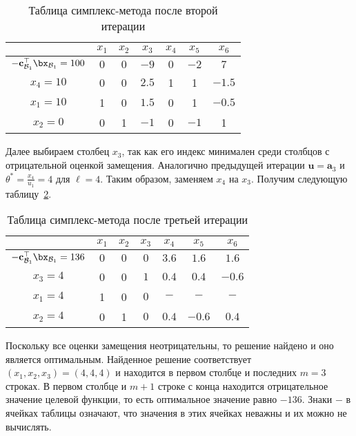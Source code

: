 \documentclass[12pt]{article}
\begin{document}
\begin{table}[!ht]
\centering
\caption{Таблица симплекс-метода после второй итерации}
\begin{tabular}{|c|cccccc|}
\hline
& $x_1$ & $x_2$ & $x_3$ & $x_4$ & $x_5$ & $x_6$\\
\hline
$-\mathbf{c}_{\mathcal{B}_1}^{\top}\bx_{\mathcal{B}_1} = 100$ & $0$ & $0$ & $-9$ & $0$ & $-2$ & $7$ \\
\hline
$x_4 = 10$ & 0 & 0 & $\mathbf{2.5}$ & 1 & 1 & $-1.5$ \\
$x_1 = 10$ & 1 & 0 & $1.5$ & 0 & 1 & $-0.5$ \\
$x_2 = 0$ & 0 & 1 & $-1$ & 0 & $-1$ & 1 \\
\hline
\end{tabular}
\label{tab::simplex2}
\end{table}

Далее выбираем столбец $x_3$, так как его индекс минимален среди столбцов с отрицательной оценкой замещения.
Аналогично предыдущей итерации $\mathbf{u} = \mathbf{a}_3$ и $\theta^* = \frac{x_4}{u_1} = 4$ для $\ell = 4$.
Таким образом, заменяем $x_4$ на $x_3$.
Получим следующую таблицу~\ref{tab::simplex3}.

\begin{table}[!ht]
\centering
\caption{Таблица симплекс-метода после третьей итерации}
\begin{tabular}{|c|cccccc|}
\hline
& $x_1$ & $x_2$ & $x_3$ & $x_4$ & $x_5$ & $x_6$\\
\hline
$-\mathbf{c}_{\mathcal{B}_1}^{\top}\bx_{\mathcal{B}_1} = 136$ & $0$ & $0$ & $0$ & $3.6$ & $1.6$ & $1.6$ \\
\hline
$x_3 = 4$ & 0 & 0 & $1$ & $0.4$ & $0.4$ & $-0.6$ \\
$x_1 = 4$ & 1 & 0 & $0$ & $-$ & $-$ & $-$ \\
$x_2 = 4$ & 0 & 1 & $0$ & $0.4$ & $-0.6$ & $0.4$ \\
\hline
\end{tabular}
\label{tab::simplex3}
\end{table}

Поскольку все оценки замещения неотрицательны, то решение найдено и оно является оптимальным. 
Найденное решение соответствует $(x_1, x_2, x_3) = (4,4,4)$ и находится в первом столбце и последних $m = 3$ строках.
В первом столбце и $m+1$ строке с конца находится отрицательное значение целевой функции, то есть оптимальное значение равно $-136$.
Знаки $-$ в ячейках таблицы означают, что значения в этих ячейках неважны и их можно не вычислять.
\end{document}

